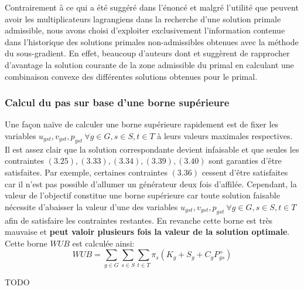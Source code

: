 \vspace*{1.2cm}

Contrairement à ce qui a été suggéré dans l'énoncé et malgré l'utilité que peuvent avoir les multiplicateurs lagrangiens
dans la recherche d'une solution primale admissible, nous avons choisi d'exploiter exclusivement l'information
contenue dans l'historique des solutions primales non-admissibles obtenues avec la méthode du sous-gradient.
En effet, beaucoup d'auteurs dont \citep{doi:10.1137/S1052623498332336} et \citep{Zhuang1988}
suggèrent de rapprocher d'avantage la solution courante de la zone admissible du primal en calculant une combinaison
convexe des différentes solutions obtenues pour le primal.


\subsubsection{Calcul du pas sur base d'une borne supérieure}

Une façon naïve de calculer une borne supérieure rapidement est de fixer les variables
$u_{gst}, v_{gst}, p_{gst} \ \forall g \in G, s \in S, t \in T$ à leurs valeurs maximales respectives.
Il est assez clair que la solution correspondante devient infaisable et que seules les contraintes 
$(3.25), (3.33), (3.34), (3.39), (3.40)$ sont garanties d'être satisfaites. Par exemple, certaines contraintes $(3.36)$ cessent d'être satisfaites
car il n'est pas possible d'allumer un générateur deux fois d'affilée. Cependant, la valeur de l'objectif constitue une borne supérieure
car toute solution faisable nécessite d'abaisser la valeur d'une des variables $u_{gst}, v_{gst}, p_{gst} \ \forall g \in G, s \in S, t \in T$
afin de satisfaire les contraintes restantes. En revanche cette borne est très mauvaise et \textbf{peut valoir plusieurs fois la valeur de la solution optimale}.
Cette borne $WUB$ est calculée ainsi:
\begin{equation}
    WUB = \sum\limits_{g \in G} \sum\limits_{s \in S} \sum\limits_{t \in T} \pi_s (K_g + S_g + C_g P_{gs}^{+})
\end{equation}

TODO
